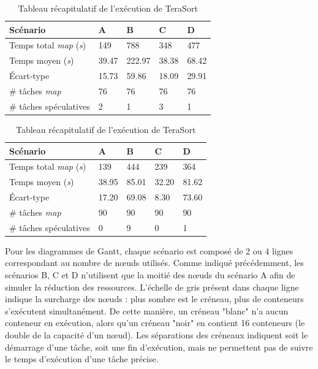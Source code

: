 \begin{table}
	\caption{Tableau récapitulatif de l'exécution de TeraSort} \label{tab:resumo}
	\centering
	\begin{tabular*}{0.6\hsize}{lllll} 
		\textbf{Scénario} & \textbf{A} & \textbf{B} & \textbf{C} & \textbf{D}\\
		\hline
		Temps total \textit{map} ({\it{s}}) & 149 & 788 & 348 & 477 \\
		Temps moyen ({\it{s}}) & 39.47 & 222.97 & 38.38 & 68.42 \\
		Écart-type & 15.73 & 59.86 & 18.09 & 29.91 \\
		\# tâches \textit{map} & 76 & 76 & 76 & 76 \\
		\# tâches spéculatives & 2 & 1 & 3 & 1 \\
	\end{tabular*}
\end{table}

\begin{table}
	\caption{Tableau récapitulatif de l'exécution de TeraSort} \label{tab:DFSIO}
	\centering
	\begin{tabular*}{0.6\hsize}{lllll} 
		\textbf{Scénario} & \textbf{A} & \textbf{B} & \textbf{C} & \textbf{D}\\
		\hline
		Temps total \textit{map} ({\it{s}}) & 139 & 444 & 239 & 364 \\
		Temps moyen ({\it{s}}) & 38.95 & 85.01 & 32.20 & 81.62 \\
		Écart-type  & 17.20 & 69.08 & 8.30 & 73.60 \\
		\# tâches \textit{map} & 90 & 90 & 90 & 90 \\
		\# tâches spéculatives & 0 & 9 & 0 & 1 \\
	\end{tabular*}
\end{table}


Pour les diagrammes de Gantt, chaque scénario est composé de 2 ou 4 lignes correspondant au nombre de n{\oe}uds utilisés. Comme indiqué précédemment, les scénarios B, C et D n'utilisent que la moitié des n{\oe}uds du scénario A afin de simuler la réduction des ressources. L'échelle de gris présent dans chaque ligne indique la surcharge des n{\oe}uds : plus sombre est le créneau, plus de conteneurs s'exécutent simultanément. De cette manière, un créneau "blanc" n'a aucun conteneur en exécution, alors qu'un créneau "noir" en contient 16 conteneurs (le double de la capacité d'un n{\oe}ud). Les séparations des créneaux indiquent soit le démarrage d'une tâche, soit une fin d'exécution, mais ne permettent pas de suivre le temps d'exécution d'une tâche précise. 

